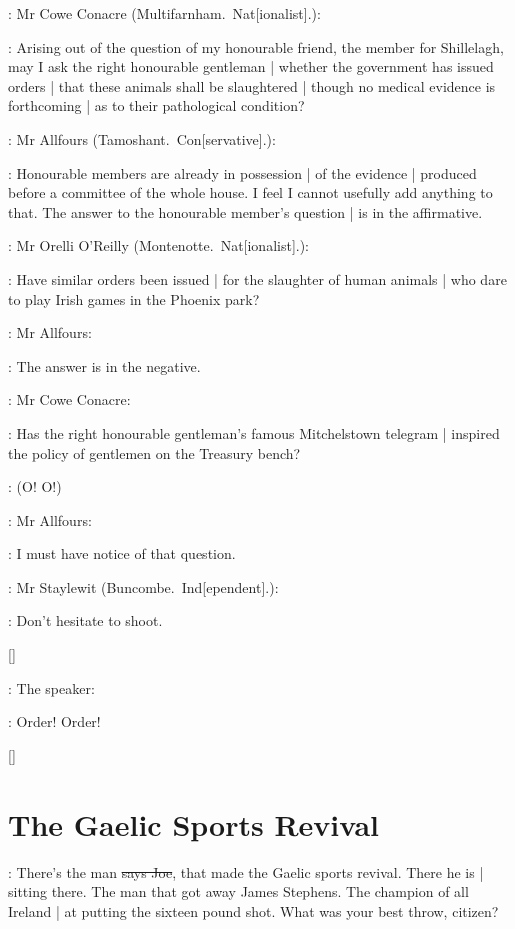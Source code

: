 :
Mr Cowe Conacre
(Multifarnham.~Nat[ionalist].):

\conacre:
Arising out of the question of my honourable friend,
the member for Shillelagh,
may I ask the right honourable gentleman |
whether the government has issued orders |
that these animals shall be slaughtered |
though no medical evidence is forthcoming |
as to their pathological condition?

:
Mr Allfours
(Tamoshant.~Con[servative].):

\allfours:
Honourable members are already in possession |
of the evidence |
produced before a committee of the whole house.
I feel I cannot usefully add anything to that.
The answer to the honourable member's question |
is in the affirmative.

:
Mr Orelli O'Reilly
(Montenotte.~Nat[ionalist].):


\oreilly:
Have similar orders been issued |
for the slaughter of human animals
 |
who dare to play Irish games in the Phoenix park?

:
Mr Allfours:

\allfours:
The answer is in the negative.

:
Mr Cowe Conacre:

\conacre:
Has the right honourable gentleman's famous Mitchelstown telegram |
inspired the policy of gentlemen on the Treasury bench?

\All:
(O!
O!)

:
Mr Allfours:

\allfours:
I must have notice of that question.

:
Mr Staylewit
(Buncombe.~Ind[ependent].):

\staylewit:
Don't hesitate to shoot.

[]

:
The speaker:

\Speaker:
Order!
Order!

[]


\section{The Gaelic Sports Revival}

\joe:
There's the man
\sout{says Joe},
that made the Gaelic sports revival.
There he is |
sitting there.
The man that got away James Stephens.
The champion of all Ireland |
at putting the sixteen pound shot.
What was your best throw,
citizen?

